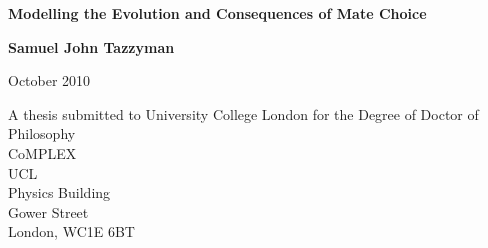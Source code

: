 \begin{titlepage}

\begin{center}

{ \huge \textbf{Modelling the Evolution and Consequences of Mate Choice} }\\[0.4cm]
\begin{center}
\vfill
\vfill
\large\textbf{Samuel John Tazzyman}
\end{center}

\begin{center}
\vfill
October 2010\\
\end{center}

\vfill
\begin{center}
A thesis submitted to University College London for the Degree of Doctor of Philosophy\\
\vfill
CoMPLEX\\
UCL\\
Physics Building\\
Gower Street\\
London, WC1E 6BT\\
\end{center}
\vfill


\end{center}

\end{titlepage}